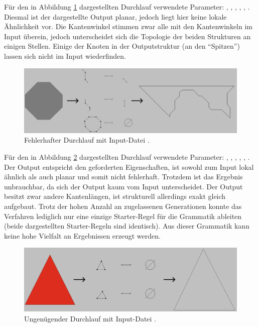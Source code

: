 Für den in Abbildung \ref{fig:octagon_fail} dargestellten Durchlauf verwendete Parameter: , , ,
, , . Diesmal ist der dargestellte Output planar, jedoch liegt hier keine lokale Ähnlichkeit
vor. Die Kantenwinkel stimmen zwar alle mit den Kantenwinkeln im Input überein, jedoch unterscheidet sich die Topologie der beiden Strukturen an einigen Stellen.
Einige der Knoten in der Outputstruktur (an den ``Spitzen'') lassen sich nicht im Input wiederfinden.
\begin{figure}[H]
    \centering
    \includegraphics[width=\textwidth]{images/octagon_fail.png}
    \caption{Fehlerhafter Durchlauf mit Input-Datei .}
    \label{fig:octagon_fail}
\end{figure}

Für den in Abbildung \ref{fig:triangle_fail} dargestellten Durchlauf verwendete Parameter: , , ,
, , . Der Output entspricht den geforderten Eigenschaften, ist sowohl zum Input lokal
ähnlich als auch planar und somit nicht fehlerhaft. Trotzdem ist das Ergebnis unbrauchbar, da sich der Output kaum vom Input unterscheidet. Der Output
besitzt zwar andere Kantenlängen, ist strukturell allerdings exakt gleich aufgebaut. Trotz der hohen Anzahl an zugelassenen Generationen konnte das Verfahren
lediglich nur eine einzige Starter-Regel für die Grammatik ableiten (beide dargestellten Starter-Regeln sind identisch). Aus dieser Grammatik kann keine
hohe Vielfalt an Ergebnissen erzeugt werden.
\begin{figure}[H]  
    \centering  
    \includegraphics[width=\textwidth]{images/triangle_fail.png}
    \caption{Ungenügender Durchlauf mit Input-Datei .}
    \label{fig:triangle_fail}
\end{figure}

